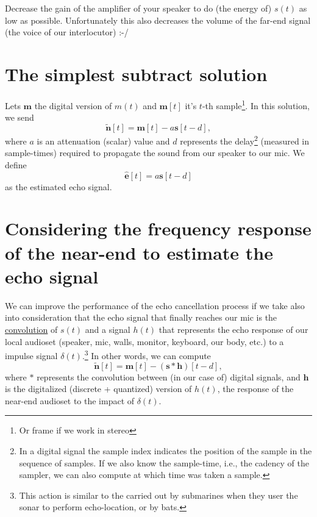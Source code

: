 Decrease the gain of the amplifier of your speaker to do (the energy
of) $s(t)$ as low as possible. Unfortunately this also decreases the
volume of the far-end signal (the voice of our interlocutor) :-/

\section{The simplest subtract solution}
Lets ${\mathbf m}$ the digital version of $m(t)$ and ${\mathbf m}[t]$
it's $t$-th sample\footnote{Or frame if we work in stereo}. In this
solution, we send
\begin{equation}
  \tilde{\mathbf n}[t] = {\mathbf m}[t] - a{\mathbf s}[t-d],
  \label{eq:simplest}
\end{equation}
where $a$ is an attenuation (scalar) value and $d$ represents the
delay\footnote{In a digital signal the sample index indicates the
  position of the sample in the sequence of samples. If we also know
  the sample-time, i.e., the cadency of the sampler, we can also
  compute at which time was taken a sample.} (measured in
sample-times) required to propagate the sound from our speaker to our
mic. We define
\begin{equation}
  \hat{\mathbf e}[t] = a{\mathbf s}[t-d]
\end{equation}
as the estimated echo signal.

\section{Considering the frequency response of the near-end to estimate the echo signal}
We can improve the performance of the echo cancellation process if we
take also into consideration that the echo signal that finally reaches
our mic is the
\href{https://en.wikipedia.org/wiki/Convolution}{convolution} of
$s(t)$ and a signal $h(t)$ that represents the echo response of our
local audioset (speaker, mic, walls, monitor, keyboard, our body,
etc.) to a impulse signal $\delta(t)$.\footnote{This action is similar
  to the carried out by submarines when they user the sonar to perform
  echo-location, or by bats.} In other words, we can compute
\begin{equation}
 \tilde{\mathbf n}[t] = {\mathbf m}[t] - ({\mathbf s}*{\mathbf h})[t-d],
  \label{eq:using_convolution}
\end{equation}
where $*$ represents the convolution between (in our case of) digital
signals, and ${\mathbf h}$ is the digitalized (discrete + quantized)
version of $h(t)$, the response of the near-end audioset to the impact
of $\delta(t)$.

